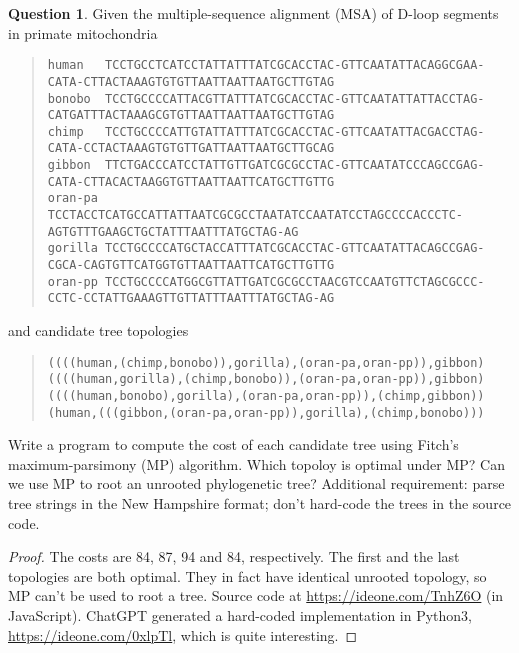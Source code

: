 \documentclass{article}[10pt]
\theoremstyle{definition}\newtheorem{question}{Question}
\begin{document}
\begin{question}
Given the multiple-sequence alignment (MSA) of D-loop segments in primate mitochondria
\begin{quote}
\footnotesize\verb|human   TCCTGCCTCATCCTATTATTTATCGCACCTAC-GTTCAATATTACAGGCGAA-CATA-CTTACTAAAGTGTGTTAATTAATTAATGCTTGTAG|\\
\footnotesize\verb|bonobo  TCCTGCCCCATTACGTTATTTATCGCACCTAC-GTTCAATATTATTACCTAG-CATGATTTACTAAAGCGTGTTAATTAATTAATGCTTGTAG|\\
\footnotesize\verb|chimp   TCCTGCCCCATTGTATTATTTATCGCACCTAC-GTTCAATATTACGACCTAG-CATA-CCTACTAAAGTGTGTTGATTAATTAATGCTTGCAG|\\
\footnotesize\verb|gibbon  TTCTGACCCATCCTATTGTTGATCGCGCCTAC-GTTCAATATCCCAGCCGAG-CATA-CTTACACTAAGGTGTTAATTAATTCATGCTTGTTG|\\
\footnotesize\verb|oran-pa TCCTACCTCATGCCATTATTAATCGCGCCTAATATCCAATATCCTAGCCCCACCCTC-AGTGTTTGAAGCTGCTATTTAATTTATGCTAG-AG|\\
\footnotesize\verb|gorilla TCCTGCCCCATGCTACCATTTATCGCACCTAC-GTTCAATATTACAGCCGAG-CGCA-CAGTGTTCATGGTGTTAATTAATTCATGCTTGTTG|\\
\footnotesize\verb|oran-pp TCCTGCCCCATGGCGTTATTGATCGCGCCTAACGTCCAATGTTCTAGCGCCC-CCTC-CCTATTGAAAGTTGTTATTTAATTTATGCTAG-AG|
\end{quote}
and candidate tree topologies
\begin{quote}
\footnotesize\tt ((((human,(chimp,bonobo)),gorilla),(oran-pa,oran-pp)),gibbon)\\
\footnotesize\tt ((((human,gorilla),(chimp,bonobo)),(oran-pa,oran-pp)),gibbon)\\
\footnotesize\tt ((((human,bonobo),gorilla),(oran-pa,oran-pp)),(chimp,gibbon))\\
\footnotesize\tt (human,(((gibbon,(oran-pa,oran-pp)),gorilla),(chimp,bonobo)))
\end{quote}
Write a program to compute the cost of each candidate tree using Fitch's maximum-parsimony (MP) algorithm.
Which topoloy is optimal under MP? Can we use MP to root an unrooted phylogenetic tree?
Additional requirement: parse tree strings in the New Hampshire format; don't hard-code the trees in the source code.
\end{question}

\begin{proof}
The costs are 84, 87, 94 and 84, respectively. The first and the last topologies are both optimal.
They in fact have identical unrooted topology, so MP can't be used to root a tree.
Source code at \url{https://ideone.com/TnhZ6O} (in JavaScript).
ChatGPT generated a hard-coded implementation in Python3, \url{https://ideone.com/0xlpTl}, which is quite interesting.
\end{proof}
\end{document}
